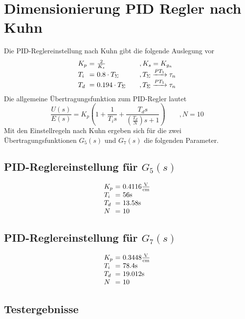 \section{Dimensionierung PID Regler nach Kuhn}
Die PID-Reglereinstellung nach Kuhn gibt die folgende Auslegung vor
\[
	\begin{array}{l@{~}c@{~}l@{\qquad}l}
        K_p & = & \frac{2}{K_s}         & ,K_s = K_{g_n} \\
        T_i & = & 0.8 \cdot T_\Sigma    & ,T_\Sigma \xrightarrow{PT_1} \tau_n \\
        T_d & = & 0.194 \cdot T_\Sigma  & ,T_\Sigma \xrightarrow{PT_1} \tau_n \\
	\end{array}
\]
Die allgemeine Übertragungsfunktion zum PID-Regler lautet
\[
	\frac{U(s)}{E(s)}
	= K_p \left(
		1 + \frac{1}{T_i s}
		+ \frac{T_d s}{\left(\frac{T_d}{N}\right)s + 1}
	\right)
	\qquad , N = 10
\]
Mit den Einstellregeln nach Kuhn ergeben sich für die zwei
Übertragungsfunktionen $G_5(s)$ und $G_7(s)$ die folgenden Parameter.

\subsection{PID-Reglereinstellung für $G_5(s)$}
\[
	\begin{array}{l@{~}c@{~}l}
		K_p & = & 0.4116 \si[per-mode = fraction]{\volt\per\cm} \\
		T_i & = & 56 \si{\second} \\
		T_d & = & 13.58 \si{\second} \\
		N & = & 10
	\end{array}
\]

\subsection{PID-Reglereinstellung für $G_7(s)$}
\[
	\begin{array}{l@{~}c@{~}l}
		K_p & = & 0.3448 \si[per-mode = fraction]{\volt\per\cm} \\
		T_i & = & 78.4 \si{\second} \\
		T_d & = & 19.012 \si{\second} \\
		N & = & 10
	\end{array}
\]

\newpage
\subsection{Testergebnisse}

